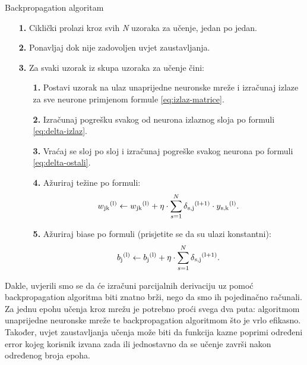 \documentclass[times, utf8, zavrsni]{fer}
\begin{document}
\begin{algorithm}
\caption{Backpropagation algoritam\footnotemark}
\label{algo:alg-backprop}
    \begin{enumerate}
        \item[\textbf{1.}] Ciklički prolazi kroz svih \textit{N} uzoraka za učenje, jedan po jedan.
        \item[\textbf{2.}] Ponavljaj dok nije zadovoljen uvjet zaustavljanja.
        \item[\textbf{3.}] Za svaki uzorak iz skupa uzoraka za učenje čini:
        \begin{enumerate}
            \item[\textbf{1.}] Postavi uzorak na ulaz unaprijedne neuronske mreže i izračunaj izlaze za sve neurone primjenom formule \eqref{eq:izlaz-matrice}.
            \item[\textbf{2.}] Izračunaj pogrešku svakog od neurona izlaznog sloja po formuli \eqref{eq:delta-izlaz}.
            \item[\textbf{3.}] Vraćaj se sloj po sloj i izračunaj pogreške svakog neurona po formuli \eqref{eq:delta-ostali}.
            \item[\textbf{4.}] Ažuriraj težine po formuli:
                \begin{equation}
                    \label{eq:azuriranje}
                    w\textsubscript{jk}\textsuperscript{(l)} \leftarrow w\textsubscript{jk}\textsuperscript{(l)} + \eta\cdot\sum\limits_{s=1}^N \delta\textsubscript{s,j}\textsuperscript{(l+1)} \cdot y\textsubscript{s,k}\textsuperscript{(l)}.
                \end{equation}
            \item[\textbf{5.}] Ažuriraj biase po formuli (prisjetite se da su ulazi konstantni):
                \begin{equation}
                    \label{eq:azuriranje-bias}
                    b\textsubscript{j}\textsuperscript{(l)} \leftarrow b\textsubscript{j}\textsuperscript{(l)} + \eta\cdot\sum\limits_{s=1}^N \delta\textsubscript{s,j}\textsuperscript{(l+1)}.
                \end{equation}
        \end{enumerate}
    \end{enumerate}
\end{algorithm}

\newpage
Dakle, uvjerili smo se da će izračuni parcijalnih derivaciju uz pomoć backpropagation algoritma biti znatno brži, nego da smo ih pojedinačno računali. Za jednu epohu učenja kroz mrežu je potrebno proći svega dva puta: algoritmom unaprijedne neuronske mreže te backpropagation algoritmom što je vrlo efikasno. Također, uvjet zaustavljanja učenja može biti da funkcija kazne poprimi određeni error kojeg korisnik izvana zada ili jednostavno da se učenje završi nakon određenog broja epoha.
\end{document}

